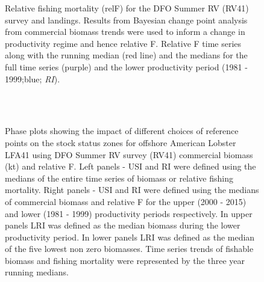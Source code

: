 \documentclass[11pt]{article}
\newcommand{\e}{/backup/bio_data/bio.lobster/figures/} %
\begin{document}
\begin{figure}
\centering
       \caption{Relative fishing mortality (relF) for the DFO Summer RV (RV41) survey and landings. Results from Bayesian change point analysis from commercial biomass trends were used to inform a change in productivity regime and hence relative F. Relative F time series along with the running median (red line) and the medians for the full time series (purple) and the lower productivity period (1981 - 1999;blue; \emph{RI}). }
\end{figure}
     \clearpage


\begin{landscape}
\begin{figure}
\centering
       \\
        \\
       
       \caption{Phase plots showing the impact of different choices of reference points on the stock status zones for offshore American Lobster LFA41 using DFO Summer RV survey (RV41) commercial biomass (kt) and relative F. Left panels  - USI and RI were defined using the medians of the entire time series of biomass or relative fishing mortality. Right panels - USI and RI were defined using the medians of commercial biomass and relative F for the upper (2000 - 2015) and lower (1981 - 1999) productivity periods respectively. In upper panels LRI was defined as the median biomass during the lower productivity period. In lower panels LRI was defined as the median of the five lowest non zero biomasses. Time series trends of fishable biomass and fishing mortality were represented by the three year running medians. }

\end{figure}
\end{landscape}

\end{document}
